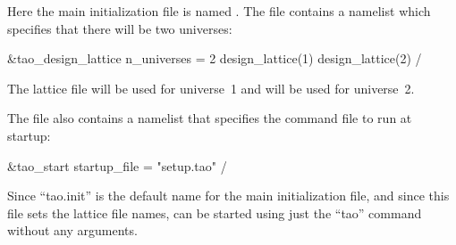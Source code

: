 \documentclass{hitec}     %
\begin{document}
Here the main initialization file is named . The  file contains a
 namelist which specifies that there will be two universes:
\begin{code}
&tao_design_lattice
  n_universes = 2
  design_lattice(1)%
  design_lattice(2)%
/
\end{code}
The lattice file  will be used for universe~1 and  will be used for
universe~2.

The  file also contains a  namelist that specifies the command file to
run at startup:
\begin{code}
&tao_start
  startup_file = "setup.tao"
/
\end{code}

Since ``tao.init'' is the default name for the main initialization file, and since this file sets the lattice file names, \tao can be started using just the ``tao'' command without any arguments.
\end{document}

